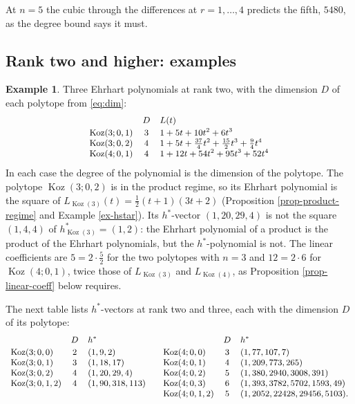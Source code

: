 \documentclass[11pt, a4paper, abstract=yes]{scrartcl}
\theoremstyle{definition}
\newtheorem{mexample}[definition]{Example}
\theoremstyle{remark}
\theoremstyle{plain}
\theoremstyle{remark}
\theoremstyle{plain}
\newcommand{\Koz}{\operatorname{Koz}}
\begin{document}
At \(n=5\) the cubic through the differences at \(r=1,\dots,4\) predicts the fifth, \(5480\), as the
degree bound says it must.
\subsection{Rank two and higher: examples}
\label{sec:orgffcd4f2}

\begin{mexample}
Three Ehrhart polynomials at rank two, with the dimension \(D\) of each polytope from \eqref{eq:dim}:
\[\small
\begin{array}{lcl}
 & D & L(t)\\[2pt]
\Koz(3;0,1) & 3 & 1+5t+10t^2+6t^3\\
\Koz(3;0,2) & 4 & 1+5t+\tfrac{37}4t^2+\tfrac{15}2t^3+\tfrac94t^4\\
\Koz(4;0,1) & 4 & 1+12t+54t^2+95t^3+52t^4
\end{array}
\]
In each case the degree of the polynomial is the dimension of the polytope. The polytope
\(\Koz(3;0,2)\) is in the product regime, so its Ehrhart polynomial is the square of
\(L_{\Koz(3)}(t)=\tfrac12(t+1)(3t+2)\) (Proposition \ref{prop-product-regime} and Example \ref{ex-hstar}). Its
\(h^*\)-vector \((1,20,29,4)\) is not the square \((1,4,4)\) of \(h^*_{\Koz(3)}=(1,2)\): the Ehrhart
polynomial of a product is the product of the Ehrhart polynomials, but the \(h^*\)-polynomial is not.
The linear coefficients are \(5=2\cdot\tfrac52\) for the two polytopes with \(n=3\) and \(12=2\cdot6\)
for \(\Koz(4;0,1)\), twice those of \(L_{\Koz(3)}\) and \(L_{\Koz(4)}\), as Proposition \ref{prop-linear-coeff}
below requires.

The next table lists \(h^*\)-vectors at rank two and three, each with the dimension \(D\) of its
polytope:
\[\small
\begin{array}{lcl@{\qquad}lcl}
 & D & h^* & & D & h^*\\[2pt]
\Koz(3;0,0) & 2 & (1,9,2) & \Koz(4;0,0) & 3 & (1,77,107,7)\\
\Koz(3;0,1) & 3 & (1,18,17) & \Koz(4;0,1) & 4 & (1,209,773,265)\\
\Koz(3;0,2) & 4 & (1,20,29,4) & \Koz(4;0,2) & 5 & (1,380,2940,3008,391)\\
\Koz(3;0,1,2) & 4 & (1,90,318,113) & \Koz(4;0,3) & 6 & (1,393,3782,5702,1593,49)\\
 & & & \Koz(4;0,1,2) & 5 & (1,2052,22428,29456,5103).
\end{array}
\]
\label{ex-ehrhart-rank2}
\end{mexample}
\end{document}

